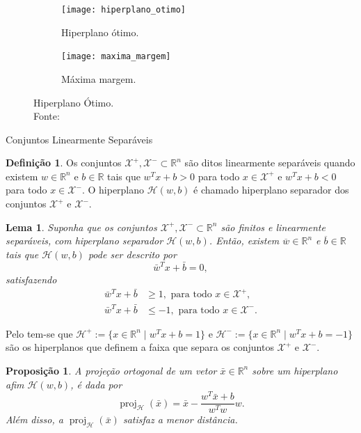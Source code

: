 \documentclass{beamer}
\DeclareMathOperator{\proj}{proj}
\def\Xset{\mathcal{X}}
\def\Hset{\mathcal{H}}
\def\RR{\mathds{R}}
\def\xbar{\bar{x}}
\def\wbar{\bar{w}}
\def\bbar{\bar{b}}
\newtheorem{prop}{Proposição}
\newtheorem{lema}{Lema}
\theoremstyle{definition}%
\newtheorem{defi}{Definição}
\begin{document}
\begin{frame}
\begin{figure}[h] 
	\centering
	\begin{subfigure}[h]{0.4\textwidth}
		\centering
		\texttt{[image: hiperplano\_otimo]}
		\caption{Hiperplano ótimo. \label{fig3:a}}
	\end{subfigure}
	\begin{subfigure}[h]{0.4\textwidth}
		\centering
		\texttt{[image: maxima\_margem]}
		\caption{Máxima margem. \label{fig3:b}}	
	\end{subfigure}
	\caption{Hiperplano Ótimo. \label{fig3}
		\\ Fonte: \textcite{Evelin2017}}
\end{figure}
\end{frame}


\begin{frame}{Conjuntos Linearmente Separáveis}
\begin{defi} \label{def1} Os conjuntos $\Xset^{+}, \Xset^{-} \subset \RR^n$ são ditos linearmente separáveis quando existem $w\in \RR^n$ e $b\in \RR$  tais que $w^{T}x+b>0$ para todo $x\in \Xset^{+}$ e $w^{T}x+b<0$ para todo $x\in \Xset^{-}$. O hiperplano $\Hset(w,b)$ é chamado hiperplano separador dos conjuntos $\Xset^{+}$ e $\Xset^{-}$.
\end{defi}
\end{frame}


\begin{frame}
\begin{lema} \label{lema1} Suponha que os conjuntos $\Xset^{+}, \Xset^{-} \subset \RR^n$ são finitos e linearmente separáveis, com hiperplano separador $\Hset(w,b)$. Então, existem $\overline{w}\in \RR^n$ e $\overline{b}\in \RR$ tais que $\Hset(w,b)$ pode ser descrito por
	\[
	\wbar^{T}x+\bbar =0,
	\]
	satisfazendo
	\begin{align}
	\wbar^{T}x+\bbar &\geq 1, \text{ para todo } x\in \Xset^{+}, \label{eq1} \\
	\wbar^{T}x+\bbar &\leq -1, \text{ para todo } x\in \Xset^{-}. \label{eq2}
	\end{align}
\end{lema} 
\end{frame}


\begin{frame}
Pelo  tem-se que $\Hset^{+}:=\{x\in \RR^n \mid w^{T}x+b= 1\}$ e $\Hset^{-}:=\{x\in \RR^n \mid w^{T}x+b= -1\}$ são os hiperplanos que definem a faixa que separa os conjuntos $\Xset^{+}$ e $\Xset^{-}$.

\begin{prop} \label{prop1} A projeção ortogonal de um vetor $\xbar\in \RR^n$ sobre um hiperplano afim $\Hset(w,b)$, é dada por
	\[ \proj_{\Hset}(\xbar)= \xbar - \dfrac{w^{T}\xbar+b}{w^{T}w}w. \]
	Além disso, a $\proj_{\Hset}(\xbar)$ satisfaz a menor distância.
\end{prop}
\end{frame}
\end{document}

